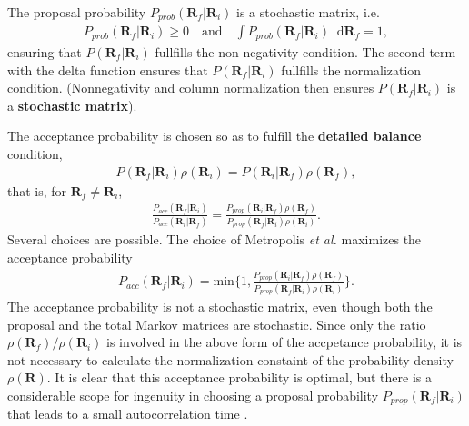 \documentclass[twoside,english]{uiofysmaster}
\newcommand*\dif{\mathop{}\!\mathrm{d}}
\begin{document}
The proposal probability $P_{prob}(\bm{R}_f |\bm{R}_i )$ is a stochastic matrix, i.e.
\begin{align}
	P_{prob}(\bm{R}_f |\bm{R}_i ) \geq 0 \quad \text{and} \quad
	\int P_{prob}(\bm{R}_f |\bm{R}_i ) \dif \bm{R}_f = 1,
\end{align}
ensuring that $P(\bm{R}_f| \bm{R}_i)$ fullfills the non-negativity
condition. The second term with the delta function ensures that
$P(\bm{R}_f| \bm{R}_i)$ fullfills the normalization
condition. (Nonnegativity and column normalization then ensures
$P(\bm{R}_f| \bm{R}_i)$ is a \textbf{stochastic matrix}).

The acceptance probability is chosen so as to fulfill the \textbf{detailed balance} condition,
\begin{align}
	P(\bm{R}_f| \bm{R}_i)  \rho (\bm{R}_i) = P(\bm{R}_i| \bm{R}_f) \rho (\bm{R}_f),
\end{align}
that is, for $\bm{R}_f \neq \bm{R}_i$,
\begin{align}
	\frac{ P_{acc} (\bm{R}_f| \bm{R}_i) }{ P_{acc} (\bm{R}_i| \bm{R}_f) }
	= \frac{ P_{prop} (\bm{R}_i| \bm{R}_f) \rho (\bm{R}_f) }
	{ P_{prop} (\bm{R}_f| \bm{R}_i) \rho (\bm{R}_i) }.
\end{align}
Several choices are possible. The choice of Metropolis {\em et al.}
\cite{Metropolis1953} maximizes the acceptance probability
\begin{align}
	P_{acc} (\bm{R}_f | \bm{R}_i) = \text{min} \{ 1, 
	\frac{ P_{prop} (\bm{R}_i| \bm{R}_f) \rho (\bm{R}_f) }
	{ P_{prop} (\bm{R}_f| \bm{R}_i) \rho (\bm{R}_i) } \}.
\end{align}
The acceptance probability is not a stochastic matrix, even though
both the proposal and the total Markov matrices are stochastic. Since
only the ratio $\rho (\bm{R}_f)/\rho (\bm{R}_i)$ is involved in the
above form of the accpetance probability, it is not necessary to
calculate the normalization constaint of the probability density $\rho
(\bm{R})$. It is clear that this acceptance probability is optimal,
but there is a considerable scope for ingenuity in choosing a proposal
probability $P_{prop} (\bm{R}_f| \bm{R}_i)$ that leads to a small
autocorrelation time \cite{Toulouse2016}.
\end{document}
